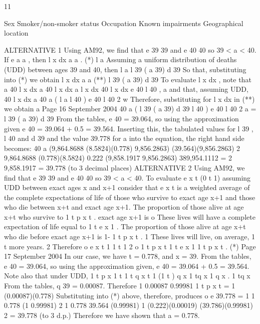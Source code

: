\documentclass[a4paper,12pt]{article}
\begin{document}
11
\item  Sex
Smoker/non-smoker status
Occupation
Known impairments
Geographical location
\item  ALTERNATIVE 1
Using AM92, we find that e 39
39 and e 40
40
so 39 < a < 40.
If
e a
a , then
l x dx
a
a
. (*)
l a
Assuming a uniform distribution of deaths (UDD) between ages 39 and 40,
then
l a l 39 ( a 39) d 39
So that, substituting into (*) we obtain
l x dx
a
a
(**)
l 39 ( a 39) d 39
To evaluate l x dx , note that
a
40
l x dx
a
40
l x dx
a
l x dx
40
l x dx e 40 l 40 ,
a
and that, assuming UDD,
40
l x dx
a
40 a
( l a l 40 ) e 40 l 40
2
w
Therefore, substituting for
l x dx in (**) we obtain
a
Page 16 %
September 2004
40 a
( l 39 ( a 39) d 39 l 40 ) e 40 l 40
2
a =
l 39 ( a 39) d 39
From the tables, e 40 = 39.064, so using the approximation given e 40 = 39.064
+ 0.5 = 39.564. Inserting this, the tabulated values for l 39 , l 40 and d 39 and the
value 39.778 for a into the equation, the right hand side becomes:
40 a
(9,864.8688 (8.5824)(0.778) 9,856.2863) (39.564)(9,856.2863)
2
9,864.8688 (0.778)(8.5824)
0.222
(9,858.1917 9,856.2863) 389,954.1112
= 2
9,858.1917
= 39.778 (to 3 decimal places)
ALTERNATIVE 2
Using AM92, we find that e 39
39 and e 40
40
so 39 < a < 40.
To evaluate e x t (0
t
1) assuming UDD between exact ages
x and x+1
consider that e x t is a weighted average of the complete expectations of life of
those who survive to exact age x+1 and those who die between x+t and exact
age x+1.
The proportion of those alive at age x+t who survive to
1 t p x t .
exact age x+1 is
o
These lives will have a complete expectation of life equal to 1 t e x 1 .
The proportion of those alive at age x+t who die before exact age x+1 is
1- 1 t p x t .
1
These lives will live, on average, 1 t more years.
2
Therefore
o
e x
t
1
1 t 1
2
o
1 t
p x
t
1 t e x
1 1 t
p x t . (*)
Page 17 %
September 2004
In our case, we have t = 0.778, and x = 39. From the tables, e 40 = 39.064,
so using the approximation given, e 40 = 39.064 + 0.5 = 39.564.
Note also that under UDD,
1 t
p x
1
t
1 t
q x
t
1
(1 t ) q x
1 tq x
1 q x
.
1 tq x
From the tables, q 39 = 0.00087. Therefore
1 0.00087
0.99981
1 t p x t =
1 (0.00087)(0.778)
Substituting into (*) above, therefore, produces
o
e 39.778
=
1
1 0.778 (1 0.99981)
2
1 0.778 39.564 (0.99981)
1
(0.222)(0.00019) (39.786)(0.99981)
2
= 39.778 (to 3 d.p.)
Therefore we have shown that a = 0.778.
\end{document}
